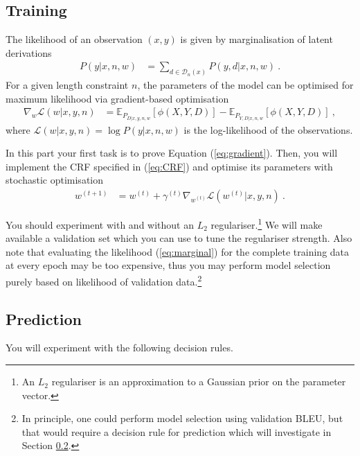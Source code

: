 \subsection{Training}

The likelihood of an observation $( x,  y)$ is given by marginalisation of latent derivations
\begin{align}\label{eq:marginal}
	P( y| x, n, w) &= \sum_{ d \in \mathcal D_n( x)} P( y,  d| x, n, w) ~ .
\end{align}
For a given length constraint $n$, the parameters of the model can be optimised for maximum likelihood via gradient-based optimisation
\begin{align}\label{eq:gradient}
\nabla_w \mathcal L(w| x,  y, n) &= \mathbb E_{P_{D|x,y,n,w}}[\phi(X, Y, D)] - \mathbb E_{P_{Y,D|x,n,w}}[\phi(X, Y, D)] ~,
\end{align}
where $\mathcal L(w| x,  y, n) = \log P( y| x, n, w)$ is the log-likelihood of the observations.

In this part your first task is to prove Equation (\ref{eq:gradient}).
Then, you will implement the CRF specified in (\ref{eq:CRF}) and optimise its parameters with stochastic optimisation
\begin{align}
	w^{(t+1)} &= w^{(t)} + \gamma^{(t)} \nabla_{w^{(t)}} \mathcal L(w^{(t)}|x, y, n) ~ .
\end{align}

You should experiment with and without an $L_2$ regulariser.\footnote{An $L_2$ regulariser is an approximation to a Gaussian prior on the parameter vector.}
We will make available a validation set which you can use to tune the regulariser strength.
Also note that evaluating the likelihood (\ref{eq:marginal}) for the complete training data at every epoch may be too expensive, thus you may perform model selection purely based on likelihood of validation data.\footnote{In principle, one could perform model selection using validation BLEU, but that would require a decision rule for prediction which will investigate in Section \ref{sec:prediction}.}

\subsection{Prediction}\label{sec:prediction}

You will experiment with the following decision rules.

